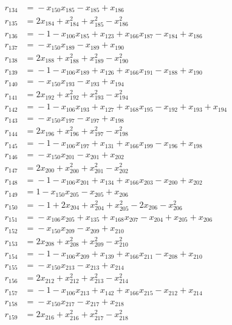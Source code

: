 \begin{align*}
r_{134} &={}-x_{150}x_{185} -x_{185} +x_{186} \\
r_{135} &={}2x_{184} +x_{184}^{2} +x_{185}^{2} -x_{186}^{2} \\
r_{136} &={}-1 -x_{106}x_{185} +x_{123} +x_{166}x_{187} -x_{184} +x_{186} \\
r_{137} &={}-x_{150}x_{189} -x_{189} +x_{190} \\
r_{138} &={}2x_{188} +x_{188}^{2} +x_{189}^{2} -x_{190}^{2} \\
r_{139} &={}-1 -x_{106}x_{189} +x_{126} +x_{166}x_{191} -x_{188} +x_{190} \\
r_{140} &={}-x_{150}x_{193} -x_{193} +x_{194} \\
r_{141} &={}2x_{192} +x_{192}^{2} +x_{193}^{2} -x_{194}^{2} \\
r_{142} &={}-1 -x_{106}x_{193} +x_{127} +x_{168}x_{195} -x_{192} +x_{193} +x_{194} \\
r_{143} &={}-x_{150}x_{197} -x_{197} +x_{198} \\
r_{144} &={}2x_{196} +x_{196}^{2} +x_{197}^{2} -x_{198}^{2} \\
r_{145} &={}-1 -x_{106}x_{197} +x_{131} +x_{166}x_{199} -x_{196} +x_{198} \\
r_{146} &={}-x_{150}x_{201} -x_{201} +x_{202} \\
r_{147} &={}2x_{200} +x_{200}^{2} +x_{201}^{2} -x_{202}^{2} \\
r_{148} &={}-1 -x_{106}x_{201} +x_{134} +x_{166}x_{203} -x_{200} +x_{202} \\
r_{149} &={}1 -x_{150}x_{205} -x_{205} +x_{206} \\
r_{150} &={}-1 +2x_{204} +x_{204}^{2} +x_{205}^{2} -2x_{206} -x_{206}^{2} \\
r_{151} &={}-x_{106}x_{205} +x_{135} +x_{168}x_{207} -x_{204} +x_{205} +x_{206} \\
r_{152} &={}-x_{150}x_{209} -x_{209} +x_{210} \\
r_{153} &={}2x_{208} +x_{208}^{2} +x_{209}^{2} -x_{210}^{2} \\
r_{154} &={}-1 -x_{106}x_{209} +x_{139} +x_{166}x_{211} -x_{208} +x_{210} \\
r_{155} &={}-x_{150}x_{213} -x_{213} +x_{214} \\
r_{156} &={}2x_{212} +x_{212}^{2} +x_{213}^{2} -x_{214}^{2} \\
r_{157} &={}-1 -x_{106}x_{213} +x_{142} +x_{166}x_{215} -x_{212} +x_{214} \\
r_{158} &={}-x_{150}x_{217} -x_{217} +x_{218} \\
r_{159} &={}2x_{216} +x_{216}^{2} +x_{217}^{2} -x_{218}^{2} \\

\end{align*}
